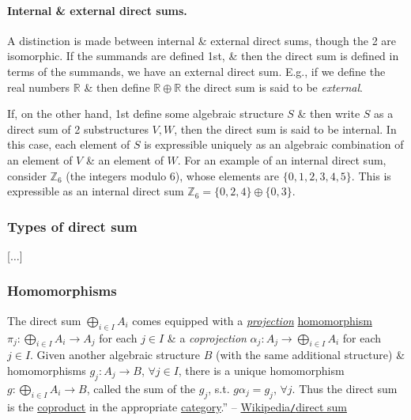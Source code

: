 \documentclass{article}
\begin{document}
\paragraph{Internal \& external direct sums.} A distinction is made between internal \& external direct sums, though the 2 are isomorphic. If the summands are defined 1st, \& then the direct sum is defined in terms of the summands, we have an external direct sum. E.g., if we define the real numbers $\mathbb{R}$ \& then define $\mathbb{R}\oplus\mathbb{R}$ the direct sum is said to be {\it external}.

If, on the other hand, 1st define some algebraic structure $S$ \& then write $S$ as a direct sum of 2 substructures $V,W$, then the direct sum is said to be internal. In this case, each element of $S$ is expressible uniquely as an algebraic combination of an element of $V$ \& an element of $W$. For an example of an internal direct sum, consider $\mathbb{Z}_6$ (the integers modulo 6), whose elements are $\{0,1,2,3,4,5\}$. This is expressible as an internal direct sum $\mathbb{Z}_6 = \{0,2,4\}\oplus\{0,3\}$.

\subsubsection{Types of direct sum}
[$\ldots$]

\subsubsection{Homomorphisms}
The direct sum $\bigoplus_{i\in I} A_i$ comes equipped with a \href{https://en.wikipedia.org/wiki/Projection_(mathematics)}{\it projection} \href{https://en.wikipedia.org/wiki/Homomorphism}{homomorphism} $\pi_j:\bigoplus_{i\in I} A_i\to A_j$ for each $j\in I$ \& a {\it coprojection} $\alpha_j:A_j\to\bigoplus_{i\in I} A_i$ for each $j\in I$. Given another algebraic structure $B$ (with the same additional structure) \& homomorphisms $g_j:A_j\to B$, $\forall j\in I$, there is a unique homomorphism $g:\bigoplus_{i\in I} A_i\to B$, called the sum of the $g_j$, s.t. $g\alpha_j = g_j$, $\forall j$. Thus the direct sum is the \href{https://en.wikipedia.org/wiki/Coproduct}{coproduct} in the appropriate \href{https://en.wikipedia.org/wiki/Category_(mathematics)}{category}.'' -- \href{https://en.wikipedia.org/wiki/Direct_sum}{Wikipedia{\tt/}direct sum}

\end{document}
